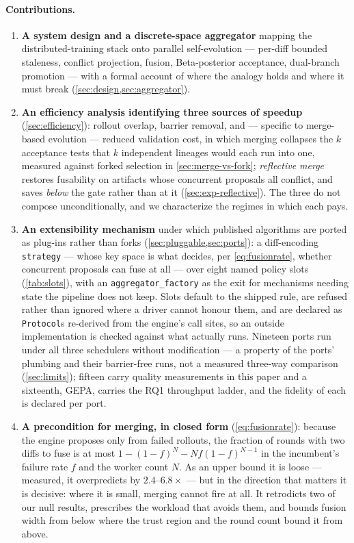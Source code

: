 \documentclass{article}
\newcommand{\code}[1]{\texttt{#1}}
\begin{document}
\paragraph{Contributions.}
\begin{enumerate}
  \item \textbf{A system design and a discrete-space aggregator} mapping the distributed-training stack onto parallel self-evolution --- per-diff bounded staleness, conflict projection, fusion, Beta-posterior acceptance, dual-branch promotion --- with a formal account of where the analogy holds and where it must break (\cref{sec:design,sec:aggregator}).
  \item \textbf{An efficiency analysis identifying three sources of speedup} (\cref{sec:efficiency}): rollout overlap, barrier removal, and --- specific to merge-based evolution --- reduced validation cost, in which merging collapses the $k$ acceptance tests that $k$ independent lineages would each run into one, measured against forked selection in \cref{sec:merge-vs-fork}; \emph{reflective merge} restores fusability on artifacts whose concurrent proposals all conflict, and saves \emph{below} the gate rather than at it (\cref{sec:exp-reflective}). The three do not compose unconditionally, and we characterize the regimes in which each pays.
  \item \textbf{An extensibility mechanism} under which published algorithms are ported as plug-ins rather than forks (\cref{sec:pluggable,sec:ports}): a diff-encoding \code{strategy} --- whose key space is what decides, per \cref{eq:fusionrate}, whether concurrent proposals can fuse at all --- over eight named policy slots (\cref{tab:slots}), with an \code{aggregator\_factory} as the exit for mechanisms needing state the pipeline does not keep. Slots default to the shipped rule, are refused rather than ignored where a driver cannot honour them, and are declared as \code{Protocol}s re-derived from the engine's call sites, so an outside implementation is checked against what actually runs. Nineteen ports run under all three schedulers without modification --- a property of the ports' plumbing and their barrier-free runs, not a measured three-way comparison (\cref{sec:limits}); fifteen carry quality measurements in this paper and a sixteenth, GEPA, carries the RQ1 throughput ladder, and the fidelity of each is declared per port.
  \item \textbf{A precondition for merging, in closed form} (\cref{eq:fusionrate}): because the engine proposes only from failed rollouts, the fraction of rounds with two diffs to fuse is at most $1-(1-f)^N-Nf(1-f)^{N-1}$ in the incumbent's failure rate $f$ and the worker count $N$. As an upper bound it is loose --- measured, it overpredicts by $2.4$--$6.8\times$ --- but in the direction that matters it is decisive: where it is small, merging cannot fire at all. It retrodicts two of our null results, prescribes the workload that avoids them, and bounds fusion width from below where the trust region and the round count bound it from above.

\end{enumerate}
\end{document}
